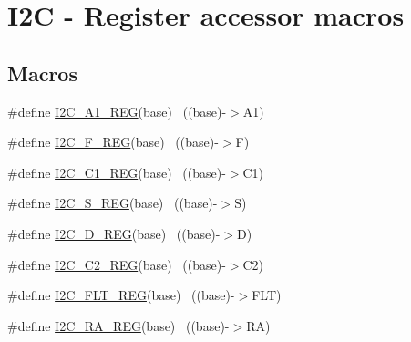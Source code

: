 \hypertarget{group___i2_c___register___accessor___macros}{}\section{I2C -\/ Register accessor macros}
\label{group___i2_c___register___accessor___macros}
\subsection*{Macros}
\begin{DoxyCompactItemize}
\item 
\#define \hyperlink{group___i2_c___register___accessor___macros_gaf3e90bf855e545f82942bfb9207756a6}{I2\+C\+\_\+\+A1\+\_\+\+R\+EG}(base)                                              ~((base)-\/$>$A1)
\item 
\#define \hyperlink{group___i2_c___register___accessor___macros_ga7aae8ba32e5e505c2db1bbc3b7c20213}{I2\+C\+\_\+\+F\+\_\+\+R\+EG}(base)                                                ~((base)-\/$>$F)
\item 
\#define \hyperlink{group___i2_c___register___accessor___macros_ga339b4af5c87abf62ac1689a412de6253}{I2\+C\+\_\+\+C1\+\_\+\+R\+EG}(base)                                              ~((base)-\/$>$C1)
\item 
\#define \hyperlink{group___i2_c___register___accessor___macros_ga6731d8ddb2a07ae27efc7424ef7fb218}{I2\+C\+\_\+\+S\+\_\+\+R\+EG}(base)                                                ~((base)-\/$>$S)
\item 
\#define \hyperlink{group___i2_c___register___accessor___macros_gae63c8db26394d46c618decb6ce6dbf32}{I2\+C\+\_\+\+D\+\_\+\+R\+EG}(base)                                                ~((base)-\/$>$D)
\item 
\#define \hyperlink{group___i2_c___register___accessor___macros_ga1b1cbd6dd49b0a63bf09270e7be600b3}{I2\+C\+\_\+\+C2\+\_\+\+R\+EG}(base)                                              ~((base)-\/$>$C2)
\item 
\#define \hyperlink{group___i2_c___register___accessor___macros_gabb230346f2358d18e6f9f126c3ae2398}{I2\+C\+\_\+\+F\+L\+T\+\_\+\+R\+EG}(base)                                            ~((base)-\/$>$F\+LT)
\item 
\#define \hyperlink{group___i2_c___register___accessor___macros_ga9b674394721710e98ba9123d38b6fa1a}{I2\+C\+\_\+\+R\+A\+\_\+\+R\+EG}(base)                                              ~((base)-\/$>$RA)

\end{DoxyCompactItemize}
